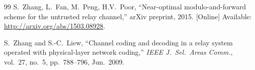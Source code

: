 \documentclass[main.tex]{subfiles}
\begin{document}
\begin{thebibliography}{99}
S.\ Zhang, L.\ Fan, M.\ Peng, H.V.~Poor, ``Near-optimal modulo-and-forward scheme for the untrusted relay channel,'' arXiv preprint, 2015. [Online] Available: \url{http://arxiv.org/abs/1503.08928}.
  
S.~Zhang and S.-C.\ Liew, ``Channel coding and decoding in a relay system
  operated with physical-layer network coding,'' 
\emph{IEEE J.\ Sel.\ Areas Comm.}, vol.~27, no.~5, pp.\ 788--796, Jun.\ 2009.















\end{thebibliography}
\end{document}
